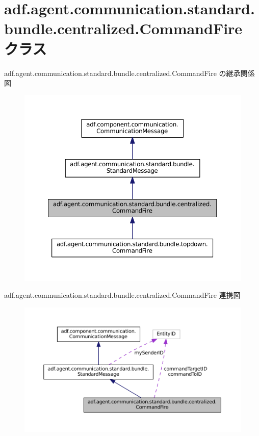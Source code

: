 \hypertarget{classadf_1_1agent_1_1communication_1_1standard_1_1bundle_1_1centralized_1_1CommandFire}{}\section{adf.\+agent.\+communication.\+standard.\+bundle.\+centralized.\+Command\+Fire クラス}
\label{classadf_1_1agent_1_1communication_1_1standard_1_1bundle_1_1centralized_1_1CommandFire}


adf.\+agent.\+communication.\+standard.\+bundle.\+centralized.\+Command\+Fire の継承関係図
\nopagebreak
\begin{figure}[H]
\begin{center}
\leavevmode
\includegraphics[width=350pt]{classadf_1_1agent_1_1communication_1_1standard_1_1bundle_1_1centralized_1_1CommandFire__inherit__graph}
\end{center}
\end{figure}


adf.\+agent.\+communication.\+standard.\+bundle.\+centralized.\+Command\+Fire 連携図
\nopagebreak
\begin{figure}[H]
\begin{center}
\leavevmode
\includegraphics[width=350pt]{classadf_1_1agent_1_1communication_1_1standard_1_1bundle_1_1centralized_1_1CommandFire__coll__graph}
\end{center}
\end{figure}
